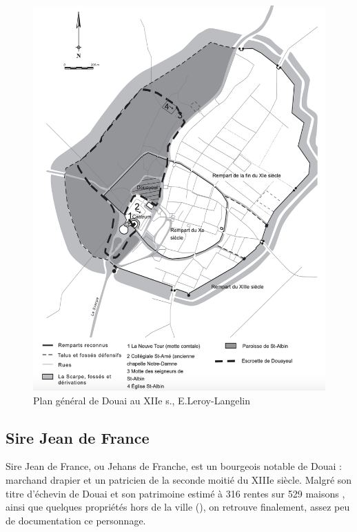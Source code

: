 \begin{figure}[ht] %
    \centering
    \includegraphics{1.Introduction/Img/Plan général de la ville de Douai avec les enceintes successives. DAO : E. Leroy-Langelin.png} 
    \caption{Plan général de Douai au XIIe s., E.Leroy-Langelin}
\end{figure}


\subsection{Sire Jean de France}
Sire Jean de France, ou Jehans de Franche, est un bourgeois notable de Douai : marchand drapier et un patricien de la seconde moitié du  XIIIe siècle.
Malgré son titre d'échevin de Douai et son patrimoine estimé à 316 rentes sur 529 maisons , ainsi que quelques propriétés hors de la ville (\cite{blockmans_trois_1941}), on retrouve finalement, assez peu de documentation ce personnage.

